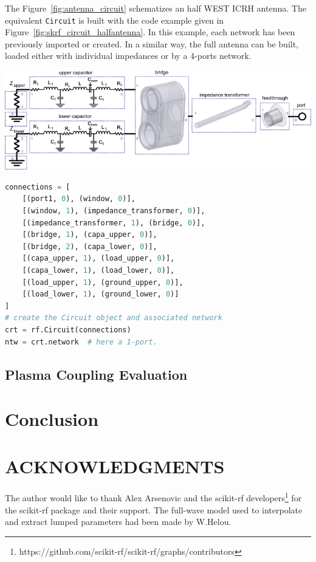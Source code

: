 \documentclass{aip-cp}
\begin{document}
The Figure~\ref{fig:antenna_circuit} schematizes an half WEST ICRH antenna. The equivalent \texttt{Circuit} is built with the code example given in Figure~\ref{fig:skrf_circuit_halfantenna}. In this example, each network has been previously imported or created. In a similar way, the full antenna can be built, loaded either with individual impedances or by a 4-ports network.

\begin{minipage}{\textwidth}
	\begin{minipage}[b]{0.57\textwidth}
		\centering
		\includegraphics[width=\linewidth]{figures/antenna_circuit}
		\label{fig:antenna_circuit}
	\end{minipage}
	\hfill
	\begin{minipage}[b]{0.4\textwidth}
\begin{lstlisting}[language=Python, basicstyle=\tiny]
connections = [
	[(port1, 0), (window, 0)], 
	[(window, 1), (impedance_transformer, 0)],
	[(impedance_transformer, 1), (bridge, 0)],
	[(bridge, 1), (capa_upper, 0)],
	[(bridge, 2), (capa_lower, 0)],
	[(capa_upper, 1), (load_upper, 0)],
	[(capa_lower, 1), (load_lower, 0)],
	[(load_upper, 1), (ground_upper, 0)],
	[(load_lower, 1), (ground_lower, 0)]
]
# create the Circuit object and associated network 
crt = rf.Circuit(connections)  
ntw = crt.network  # here a 1-port.
\end{lstlisting}
	\label{fig:skrf_circuit_halfantenna}
\end{minipage}

\end{minipage}

\subsection{Plasma Coupling Evaluation}

\section{Conclusion}


\section{ACKNOWLEDGMENTS}
The author would like to thank Alex Arsenovic and the  scikit-rf developers\footnote{https://github.com/scikit-rf/scikit-rf/graphs/contributors} for the scikit-rf package and their support. The full-wave model used to interpolate and extract lumped parameters had been made by W.Helou\cite{Helou2016}.

%
%
\end{document}

